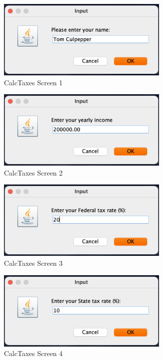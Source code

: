\documentclass[\pandocDocMode,longtable, floatsintext, noextraspace]{apa6}
\begin{document}
\begin{figure}
\hypertarget{fig:screen1}{%
\centering
\includegraphics[width=\textwidth,height=1.5in]{media/CSC310-Case1-1.png}
\caption{CalcTaxes Screen 1}\label{fig:screen1}
}
\end{figure}

\begin{figure}
\hypertarget{fig:screen2}{%
\centering
\includegraphics[width=\textwidth,height=1.5in]{media/CSC310-Case1-2.png}
\caption{CalcTaxes Screen 2}\label{fig:screen2}
}
\end{figure}

\begin{figure}
\hypertarget{fig:screen3}{%
\centering
\includegraphics[width=\textwidth,height=1.5in]{media/CSC310-Case1-3.png}
\caption{CalcTaxes Screen 3}\label{fig:screen3}
}
\end{figure}

\begin{figure}
\hypertarget{fig:screen4}{%
\centering
\includegraphics[width=\textwidth,height=1.5in]{media/CSC310-Case1-4.png}
\caption{CalcTaxes Screen 4}\label{fig:screen4}
}
\end{figure}
\end{document}
